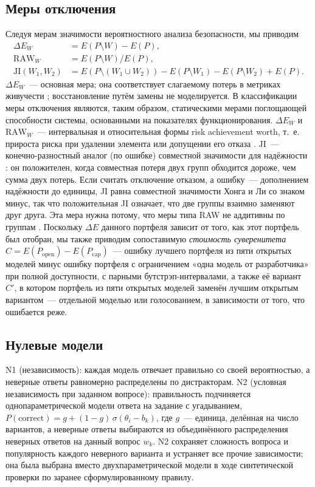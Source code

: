 \documentclass[preprint,12pt,authoryear]{elsarticle}
\newcommand{\dE}{\Delta E}
\begin{document}
\subsection{Меры отключения}
Следуя мерам значимости вероятностного анализа безопасности, мы приводим
\begin{align}
\dE_W &= E(P\setminus W) - E(P), \\
\mathrm{RAW}_W &= E(P\setminus W)/E(P), \\
\mathrm{JI}(W_1,W_2) &= E(P\setminus(W_1\cup W_2)) - E(P\setminus W_1) - E(P\setminus W_2) + E(P).
\end{align}
$\dE_W$~--- основная мера; она соответствует слагаемому потерь в метриках живучести \citep{henry2012}; восстановление путём замены не моделируется. В классификации \citet{hosseini2016} меры отключения являются, таким образом, статическими мерами поглощающей способности системы, основанными на показателях функционирования. $\dE_W$ и $\mathrm{RAW}_W$~--- интервальная и относительная формы risk achievement worth, т.~е. прироста риска при удалении элемента или допущении его отказа \citep{vesely1983}. $\mathrm{JI}$~--- конечно-разностный аналог (по ошибке) совместной значимости для надёжности \citep{honglie1993}: он положителен, когда совместная потеря двух групп обходится дороже, чем сумма двух потерь. Если считать отключение отказом, а ошибку~--- дополнением надёжности до единицы, JI равна совместной значимости Хонга и Ли со знаком минус, так что положительная JI означает, что две группы взаимно заменяют друг друга. Эта мера нужна потому, что меры типа RAW не аддитивны по группам \citep{borgonovo2001}. Поскольку $\dE$ данного портфеля зависит от того, как этот портфель был отобран, мы также приводим сопоставимую \emph{стоимость суверенитета} $C = E(P_{\text{open}}) - E(P_{\text{cap}})$~--- ошибку лучшего портфеля из пяти открытых моделей минус ошибку портфеля с ограничением «одна модель от разработчика» при полной доступности, с парными бутстрэп-интервалами, а также её вариант $C'$, в котором портфель из пяти открытых моделей заменён лучшим открытым вариантом~--- отдельной моделью или голосованием, в зависимости от того, что ошибается реже.

\subsection{Нулевые модели}
N1 (независимость): каждая модель отвечает правильно со своей вероятностью, а неверные ответы равномерно распределены по дистракторам. N2 (условная независимость при заданном вопросе): правильность подчиняется однопараметрической модели ответа на задание с угадыванием, $P(\text{correct}) = g + (1-g)\,\sigma(\theta_i - b_k)$, где $g$~--- единица, делённая на число вариантов, а неверные ответы выбираются из объединённого распределения неверных ответов на данный вопрос $w_k$. N2 сохраняет сложность вопроса и популярность каждого неверного варианта и устраняет все прочие зависимости; она была выбрана вместо двухпараметрической модели в ходе синтетической проверки по заранее сформулированному правилу.
\end{document}
